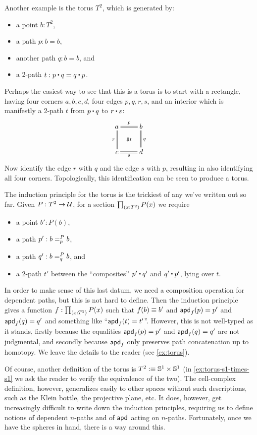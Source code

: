 %
Another example is the torus $T^2$, which is generated by:
\begin{itemize}
\item a point $b:T^2$,
\item a path $p:b=b$,
\item another path $q:b=b$, and
\item a 2-path $t: p\ct q = q \ct p$.
\end{itemize}
Perhaps the easiest way to see that this is a torus is to start with a rectangle, having four corners $a,b,c,d$, four edges $p,q,r,s$, and an interior which is manifestly a 2-path $t$ from $p\ct q$ to $r\ct s$:
\begin{equation*}
  \vcenter{\xymatrix{
      a\ar@{=}[r]^p\ar@{=}[d]_r \ar@{}[dr]|{\Downarrow t} &
      b\ar@{=}[d]^q\\
      c\ar@{=}[r]_s &
      d
      }}
\end{equation*}
Now identify the edge $r$ with $q$ and the edge $s$ with $p$, resulting in also identifying all four corners.
Topologically, this identification can be seen to produce a torus.

%
The induction principle for the torus is the trickiest of any we've written out so far.
Given $P:T^2\to\type$, for a section $\prd{x:T^2} P(x)$ we require
\begin{itemize}
\item a point $b':P(b)$,
\item a path $p' : \dpath P p b b$,
\item a path $q' : \dpath P q b b$, and
\item a 2-path $t'$ between the ``composites'' $p'\ct q'$ and $q'\ct p'$, lying over $t$.
\end{itemize}
In order to make sense of this last datum, we need a composition operation for dependent paths, but this is not hard to define.
Then the induction principle gives a function $f:\prd{x:T^2} P(x)$ such that $f(b)\jdeq b'$ and $\apd f {p} = p'$ and $\apd f {q} = q'$ and something like ``$\apd f t = t'$''.
However, this is not well-typed as it stands, firstly because the equalities $\apd f {p} = p'$ and $\apd f {q} = q'$ are not judgmental, and secondly because $\apdfunc f$ only preserves path concatenation up to homotopy.
We leave the details to the reader (see \autoref{ex:torus}).

Of course, another definition of the torus is $T^2 \defeq \Sn^1 \times \Sn^1$ (in \autoref{ex:torus-s1-times-s1} we ask the reader to verify the equivalence of the two).
%
%
The cell-complex definition, however, generalizes easily to other spaces without such descriptions, such as the Klein bottle, the projective plane, etc.
It does, however, get increasingly difficult to write down the induction principles, requiring us to define notions of dependent $n$-paths and of $\apdfunc{}$ acting on $n$-paths.
Fortunately, once we have the spheres in hand, there is a way around this.

